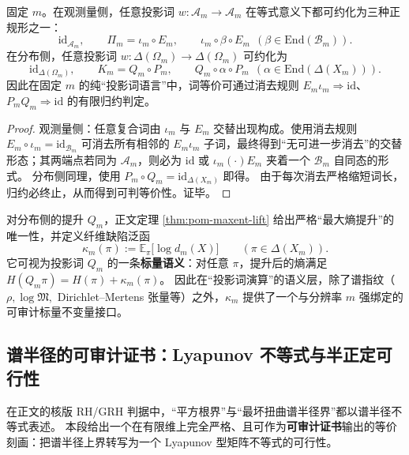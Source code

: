 \begin{proposition}[投影词正规形与可判等价]\label{prop:projection-word-normal-form}
固定 \(m\)。在观测量侧，任意投影词 \(w:\mathcal{A}_m\to\mathcal{A}_m\) 在等式意义下都可约化为三种正规形之一：
\[
\mathrm{id}_{\mathcal{A}_m},\qquad
\Pi_m=\iota_m\circ E_m,\qquad
\iota_m\circ \beta\circ E_m\ \ (\beta\in\mathrm{End}(\mathcal{B}_m)).
\]
在分布侧，任意投影词 \(w:\Delta(\Omega_m)\to\Delta(\Omega_m)\) 可约化为
\[
\mathrm{id}_{\Delta(\Omega_m)},\qquad
K_m=Q_m\circ P_m,\qquad
Q_m\circ \alpha\circ P_m\ \ (\alpha\in\mathrm{End}(\Delta(X_m))).
\]
因此在固定 \(m\) 的纯“投影词语言”中，词等价可通过消去规则 \(E_m\iota_m\Rightarrow \mathrm{id}\)、\(P_mQ_m\Rightarrow \mathrm{id}\) 的有限归约判定。
\end{proposition}
\begin{proof}
观测量侧：任意复合词由 \(\iota_m\) 与 \(E_m\) 交替出现构成。使用消去规则 \(E_m\circ\iota_m=\mathrm{id}_{\mathcal{B}_m}\) 可消去所有相邻的 \(E_m\iota_m\) 子词，最终得到“无可进一步消去”的交替形态；其两端点若同为 \(\mathcal{A}_m\)，则必为 \(\mathrm{id}\) 或 \(\iota_m(\cdot)E_m\) 夹着一个 \(\mathcal{B}_m\) 自同态的形式。
分布侧同理，使用 \(P_m\circ Q_m=\mathrm{id}_{\Delta(X_m)}\) 即得。
由于每次消去严格缩短词长，归约必终止，从而得到可判等价性。证毕。
\end{proof}

\begin{remark}[熵增作为投影词的标量语义]\label{rem:projection-word-entropy-defect}
对分布侧的提升 \(Q_m\)，正文定理 \ref{thm:pom-maxent-lift} 给出严格“最大熵提升”的唯一性，并定义纤维缺陷泛函
\[
\kappa_m(\pi):=\mathbb{E}_{\pi}\bigl[\log d_m(X)\bigr]\qquad(\pi\in\Delta(X_m)).
\]
它可视为投影词 \(Q_m\) 的一条\textbf{标量语义}：对任意 \(\pi\)，提升后的熵满足
\(
H(Q_m\pi)=H(\pi)+\kappa_m(\pi)
\)。
因此在“投影词演算”的语义层，除了谱指纹（\(\rho,\log\mathfrak{M},\) Dirichlet--Mertens 张量等）之外，\(\kappa_m\) 提供了一个与分辨率 \(m\) 强绑定的可审计标量不变量接口。
\end{remark}

\subsection{谱半径的可审计证书：Lyapunov 不等式与半正定可行性}\label{app:op-algebra-lyapunov}
在正文的核版 RH/GRH 判据中，“平方根界”与“最坏扭曲谱半径界”都以谱半径不等式表述。
本段给出一个在有限维上完全严格、且可作为\textbf{可审计证书}输出的等价刻画：把谱半径上界转写为一个 Lyapunov 型矩阵不等式的可行性。

